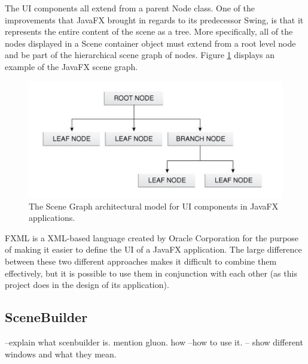 The UI components all extend from a parent Node class. One of the improvements that JavaFX brought in regards to its predecessor Swing, is that it represents the entire content of the scene as a tree. More specifically, all of the nodes displayed in a Scene container object must extend from a root level node and be part of the hierarchical scene graph of nodes. Figure \ref{fig:javafxSceneGraph}  displays an example of the JavaFX scene graph. 
\begin{figure}[th]
\centering
\includegraphics[scale=0.5]{Figures/javafx_scenegraph.JPG}
\caption{The Scene Graph architectural model for UI components in JavaFX applications.}
\label{fig:javafxSceneGraph}
\end{figure}

FXML is a XML-based language created by Oracle Corporation for the purpose of making it easier to define the UI of a JavaFX application. The large difference between these two different approaches makes it difficult to combine them effectively, but it is possible to use them in conjunction with each other (as this project does in the design of its application). 









\subsection{SceneBuilder}
--explain what scenbuilder is. mention gluon. how
--how to use it. 
-- show different windows and what they mean. 